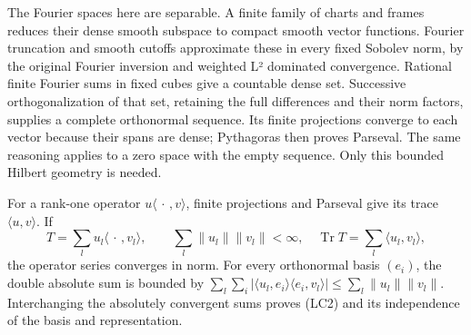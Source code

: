 \documentclass[
  11pt,
]{article}
\begin{document}
The Fourier spaces here are separable. A finite family of charts and
frames reduces their dense smooth subspace to compact smooth vector
functions. Fourier truncation and smooth cutoffs approximate these in
every fixed Sobolev norm, by the original Fourier inversion and weighted
L² dominated convergence. Rational finite Fourier sums in fixed cubes
give a countable dense set. Successive orthogonalization of that set,
retaining the full differences and their norm factors, supplies a
complete orthonormal sequence. Its finite projections converge to each
vector because their spans are dense; Pythagoras then proves Parseval.
The same reasoning applies to a zero space with the empty sequence. Only
this bounded Hilbert geometry is needed.

For a rank-one operator \(u\langle\,\cdot\,,v\rangle\), finite
projections and Parseval give its trace \(\langle u,v\rangle\). If \[
T=\sum_l u_l\langle\,\cdot\,,v_l\rangle,
\qquad \sum_l\|u_l\|\|v_l\|<\infty,
\quad
\operatorname{Tr}T=\sum_l\langle u_l,v_l\rangle,
\tag{LC2}
\] the operator series converges in norm. For every orthonormal basis
\((e_i)\), the double absolute sum is bounded by
\(\sum_l\sum_i|\langle u_l,e_i\rangle\langle e_i,v_l\rangle|
\leq\sum_l\|u_l\|\|v_l\|\). Interchanging the absolutely convergent sums
proves (LC2) and its independence of the basis and representation.
\end{document}
